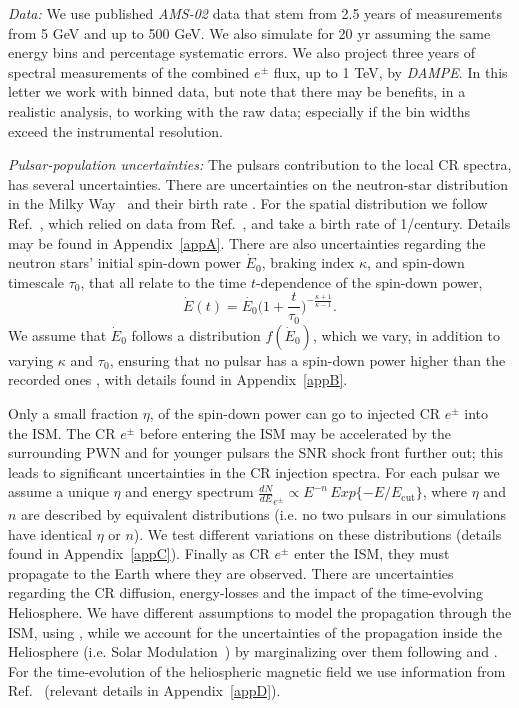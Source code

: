 \documentclass[aps,prd,twocolumn,amsmath,superscriptaddress,amssymb,showpacs,floatfix,nofootinbib]{revtex4-1}
\begin{document}
\textit{Data:} We use published \textit{AMS-02} data
\cite{Accardo:2014lma} that stem from 2.5 years 
of measurements from 5 GeV and up to 500 GeV.  We also simulate
for 20 yr assuming the same energy bins and
percentage systematic errors. We also project three years of
spectral measurements of the combined $e^\pm$ flux, up to 1 TeV,
by \textit{DAMPE}. In this letter we work with binned data, but note that 
there may be benefits, in a realistic analysis, to working with the raw 
data; especially if the bin widths exceed the instrumental resolution.

\textit{Pulsar-population uncertainties:} The pulsars
contribution to the local CR spectra, has 
several uncertainties. There are uncertainties on the
neutron-star distribution in the Milky
Way~\cite{FaucherGiguere:2005ny, Lorimer:2003qc, Lorimer:2006qs}
and their birth rate \cite{1999MNRAS.302..693D,
Vranesevic:2003tp, FaucherGiguere:2005ny, Lorimer:2006qs,
Keane:2008jj}.  For the spatial distribution we follow
Ref.~\cite{Lorimer:2006qs}, which relied on data from
Ref.~\cite{Manchester:2001fp}, and take a birth rate of 
1/century. Details may be found in Appendix~\ref{appA}.  There
are also uncertainties regarding the neutron stars' initial
spin-down power $\dot{E}_{0}$, braking index $\kappa$, and
spin-down timescale $\tau_{0}$, that all relate to the time 
$t$-dependence of the spin-down power,
\begin{equation}
\dot{E}(t) = \dot{E_{0}}  \bigg(1 + \frac{t}{\tau_{0}}  \bigg)^{-\frac{\kappa+1}{\kappa-1}}.
\label{eq:SpinDown}
\end{equation}
We assume that $\dot{E}_{0}$ follows a distribution
$f(\dot{E}_{0})$, which we vary, in addition to varying $\kappa$
and $\tau_{0}$, ensuring that no pulsar has a spin-down power
higher than the recorded ones \cite{Manchester:2004bp,
ATNFSite}, with details found in Appendix~\ref{appB}.

Only a small fraction $\eta$, of the spin-down power can go to
 injected CR $e^{\pm}$ into the ISM. The CR $e^{\pm}$ before entering 
the ISM may be accelerated by the surrounding PWN and for
younger pulsars the SNR shock front further out; this leads to
significant uncertainties in the CR injection spectra. For each
pulsar we assume a unique $\eta$ and energy spectrum
$\frac{dN}{dE}_{e^{\pm}} \propto E^{-n} \, Exp
\{-E/E_{\textrm{cut}}\}$, where $\eta$ and $n$ are described by
equivalent distributions (i.e. no two pulsars in our simulations
have identical  $\eta$ or $n$).  We test different variations on
these distributions (details found in Appendix~\ref{appC}). 
Finally as CR $e^{\pm}$ enter
the ISM, they must propagate to the Earth where they are
observed. There are uncertainties regarding the CR diffusion,
energy-losses and the impact of the time-evolving Heliosphere.
We have different assumptions to model the propagation through
the ISM, using \cite{Malyshev:2009tw, Cholis:2015gna}, while we account for the
uncertainties of the propagation inside the Heliosphere
(i.e. Solar Modulation~\cite{1968ApJ...154.1011G}) by
marginalizing over them following \cite{Cholis:2015gna} and
\cite{Cholis:2017qlb}.  For the time-evolution of the
heliospheric magnetic field we use information from
Ref.~\cite{ACESite, WSOSite} (relevant details in
Appendix~\ref{appD}). 
\end{document}
